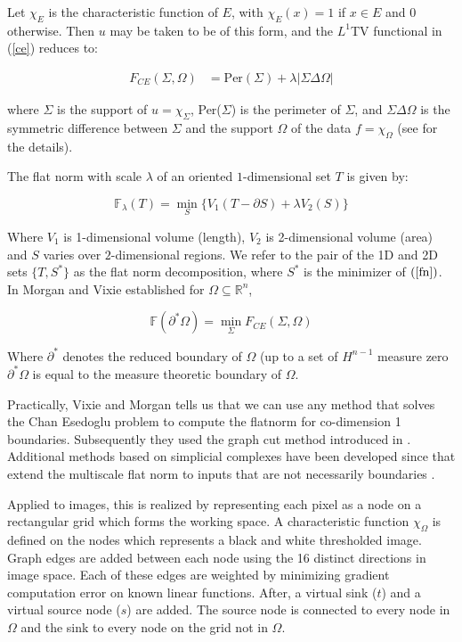 \documentclass[12pt]{article}
\begin{document}
Let $\chi_E$ is the characteristic function of $E$, with $\chi_E(x) = 1$ if $x \in E$ and $0$ otherwise. Then $u$ may be taken to be of this form, and the $L^1$TV functional in (\ref{ce}) reduces to:

\begin{align*}
F_{CE}(\Sigma,\Omega) &= \text{Per}(\Sigma) + \lambda|\Sigma \Delta \Omega|
\end{align*}

where $\Sigma$ is the support of $u = \chi_\Sigma$, Per($\Sigma$) is the perimeter of $\Sigma$, and $\Sigma \Delta \Omega$ is the symmetric difference between $\Sigma$ and the support $\Omega$ of the data $f = \chi_\Omega$ (see \cite{ce} for the details). 

The flat norm with scale $\lambda$ of an oriented $1$-dimensional set $T$ is given by:

\begin{equation} \label{fn}
\mathbb{F}_\lambda(T) = \min_S \{V_1(T-\partial S) + \lambda V_2(S)\}
\end{equation}

Where $V_1$ is 1-dimensional volume (length), $V_2$ is 2-dimensional volume (area) and $S$ varies over $2$-dimensional regions. We refer to the pair of the 1D and 2D sets $\{T,S^*\}$ as the flat norm decomposition, where $S^*$ is the minimizer of $(\ref{fn})$. In \cite{Morgan_2007} Morgan and Vixie established for $\Omega \subseteq \mathbb{R}^n$,

\begin{equation}
\mathbb{F}(\partial^* \Omega) = \min_{\Sigma} F_{CE}(\Sigma,\Omega)
\end{equation}

Where $\partial^*$ denotes the reduced boundary of $\Omega$ (up to a set of $H^{n-1}$ measure zero $\partial^* \Omega$ is equal to the measure theoretic boundary of $\Omega$.

Practically, Vixie and Morgan \cite{shapes} tells us that we can use any method that solves the Chan Esedoglu problem to compute the flatnorm for co-dimension 1 boundaries. Subsequently they used the graph cut method introduced in \cite{kolmogorov}. Additional methods based on simplicial complexes have been developed since that  extend the multiscale flat norm to inputs that are not necessarily boundaries \cite{ibrahim_simplicial}.

Applied to images, this is realized by representing each pixel as a node on a rectangular grid which forms the working space. A characteristic function $\chi_\Omega$ is defined on the nodes which represents a black and white thresholded image. Graph edges are added between each node using the 16 distinct directions in image space. Each of these edges are weighted by minimizing gradient computation error on known linear functions. After, a virtual sink ($t$) and a virtual source node ($s$) are added. The source node is connected to every node in $\Omega$ and the sink to every node on the grid not in $\Omega$. 
\end{document}
